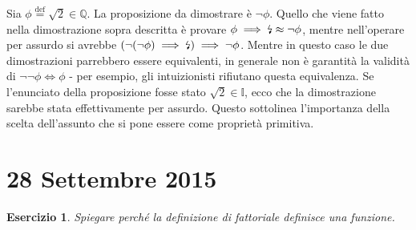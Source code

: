 \documentclass[fontsize = 11 pt, paper=A4, oneside, index=totoc, hyperref]{article}
\theoremstyle{definition}
\theoremstyle{plain}
\newtheorem{exe}{Esercizio}[section]
\newcommand{\assurdo}{\text{\lightning}}
\begin{document}
Sia \(\phi \overset{\text{def}}{=} \sqrt{2} \in \mathbb{Q}\). La proposizione da dimostrare è \(\lnot \phi\). Quello che viene fatto nella dimostrazione sopra descritta è provare \(\phi \implies \assurdo \approx \lnot \phi\), mentre nell'operare per assurdo si avrebbe \(\left(\lnot(\lnot \phi) \implies \assurdo\right) \implies \lnot \phi\). Mentre in questo caso le due dimostrazioni parrebbero essere equivalenti, in generale non è garantità la validità di \(\lnot\lnot\phi \iff \phi\)
- per esempio, gli intuizionisti rifiutano questa equivalenza. Se l'enunciato della proposizione fosse stato \(\sqrt{2} \in \mathbb{I}\), ecco che la dimostrazione sarebbe stata effettivamente per assurdo. Questo sottolinea l'importanza della scelta dell'assunto che si pone essere come proprietà primitiva.

\section{28 Settembre 2015}




\begin{exe}
  Spiegare perché la definizione di fattoriale definisce una funzione.
\end{exe}
\end{document}
